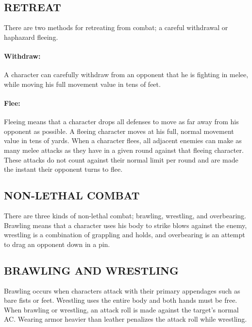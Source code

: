 \begin{multicols}{2}
\subsection{RETREAT}

There are two methods for retreating from combat; a careful withdrawal or haphazard fleeing.

\paragraph{Withdraw:} A character can carefully withdraw from an opponent that he is fighting in melee, while moving his full movement value in tens of feet.

\paragraph{Flee:} Fleeing means that a character drops all defenses to move as far away from his opponent as possible.  A fleeing character moves at his full, normal movement value in tens of yards.  When a character flees, all adjacent enemies can make as many melee attacks as they have in a given round against that fleeing character.  These attacks do not count against their normal limit per round and are made the instant their opponent turns to flee.

\subsection{NON-LETHAL COMBAT}

There are three kinds of non-lethal combat; brawling, wrestling, and overbearing.  Brawling means that a character uses his body to strike blows against the enemy, wrestling is a combination of grappling and holds, and overbearing is an attempt to drag an opponent down in a pin.

\subsection{BRAWLING AND WRESTLING}

Brawling occurs when characters attack with their primary appendages such as bare fists or feet.  Wrestling uses the entire body and both hands must be free.  When brawling or wrestling, an attack roll is made against the target's normal AC.  Wearing armor heavier than leather penalizes the attack roll while wrestling.


\end{multicols}
